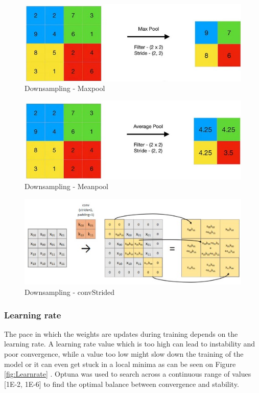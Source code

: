 \documentclass[twocolumn]{article}
\begin{document}
\begin{figure}
    \centering
    \includegraphics[width=1\linewidth]{Maxpool.jpg}
    \caption{Downsampling - Maxpool}
    \label{fig:maxpool}
\end{figure}

\begin{figure}
    \centering
    \includegraphics[width=1\linewidth]{Meanpool.jpg}
    \caption{Downsampling - Meanpool}
    \label{fig:meanpool}
\end{figure}

\begin{figure}
    \centering
    \includegraphics[width=1\linewidth]{ConvStrided.jpg}
    \caption{Downsampling - convStrided}
    \label{fig:convStrided}
\end{figure}

\subsubsection{Learning rate}
The pace in which the weights are updates during training depends on the learning rate. 
A learning rate value which is too high can lead to instability and poor convergence, while a value too low might slow down the training of the model or it can even get stuck in a local minima as can be seen on Figure \ref{fig:Learnrate} \cite{jordan_2018_setting}. 
Optuna was used to search across a continuous range of values [1E-2, 1E-6] to find the optimal balance between convergence and stability.
\end{document}
